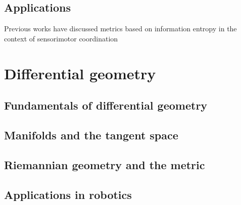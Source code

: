 \subsection{Applications}

Previous works have discussed metrics based on information entropy in the context of sensorimotor coordination \cite{Bonsignorio2020EntropyBasedMetrics}
\section{Differential geometry}
\subsection{Fundamentals of differential geometry}
\subsection{Manifolds and the tangent space}
\subsection{Riemannian geometry and the metric}
\subsection{Applications in robotics}


